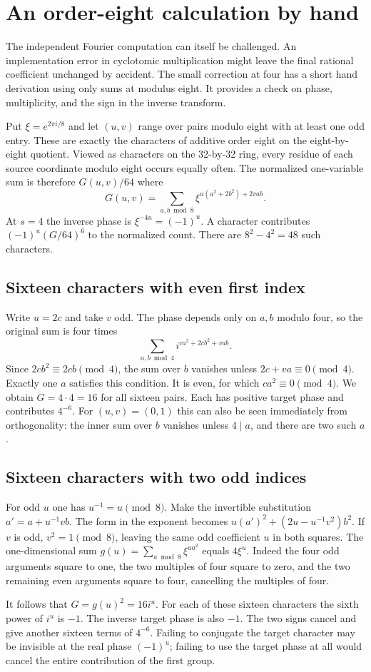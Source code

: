 \documentclass[12pt,letterpaper]{article}
\begin{document}
\section{An order-eight calculation by hand}
The independent Fourier computation can itself be challenged. An implementation error in cyclotomic multiplication might leave the final rational coefficient unchanged by accident. The small correction at four has a short hand derivation using only sums at modulus eight. It provides a check on phase, multiplicity, and the sign in the inverse transform.
\par
Put $\xi=e^{2\pi i/8}$ and let $(u,v)$ range over pairs modulo eight with at least one odd entry. These are exactly the characters of additive order eight on the eight-by-eight quotient. Viewed as characters on the 32-by-32 ring, every residue of each source coordinate modulo eight occurs equally often. The normalized one-variable sum is therefore $G(u,v)/64$ where
\[
 G(u,v)=\sum_{a,b\bmod8}\xi^{u(a^2+2b^2)+2vab}.
\]
At $s=4$ the inverse phase is $\xi^{-4u}=(-1)^u$. A character contributes $(-1)^u(G/64)^6$ to the normalized count. There are $8^2-4^2=48$ such characters.
\subsection{Sixteen characters with even first index}
Write $u=2c$ and take $v$ odd. The phase depends only on $a,b$ modulo four, so the original sum is four times
\[
    \sum_{a,b\bmod4} i^{c a^2+2c b^2+vab}.
\]
Since $2c b^2\equiv2c b\pmod4$, the sum over $b$ vanishes unless $2c+va\equiv0\pmod4$. Exactly one $a$ satisfies this condition. It is even, for which $ca^2\equiv0\pmod4$. We obtain $G=4\cdot4=16$ for all sixteen pairs. Each has positive target phase and contributes $4^{-6}$. For $(u,v)=(0,1)$ this can also be seen immediately from orthogonality: the inner sum over $b$ vanishes unless $4\mid a$, and there are two such $a$.
\subsection{Sixteen characters with two odd indices}
For odd $u$ one has $u^{-1}=u\pmod8$. Make the invertible substitution $a'=a+u^{-1}vb$. The form in the exponent becomes $u(a')^2+(2u-u^{-1}v^2)b^2$. If $v$ is odd, $v^2=1\pmod8$, leaving the same odd coefficient $u$ in both squares. The one-dimensional sum $g(u)=\sum_{a\bmod8}\xi^{ua^2}$ equals $4\xi^u$. Indeed the four odd arguments square to one, the two multiples of four square to zero, and the two remaining even arguments square to four, cancelling the multiples of four.
\par
It follows that $G=g(u)^2=16 i^u$. For each of these sixteen characters the sixth power of $i^u$ is $-1$. The inverse target phase is also $-1$. The two signs cancel and give another sixteen terms of $4^{-6}$. Failing to conjugate the target character may be invisible at the real phase $(-1)^u$; failing to use the target phase at all would cancel the entire contribution of the first group.
\end{document}

